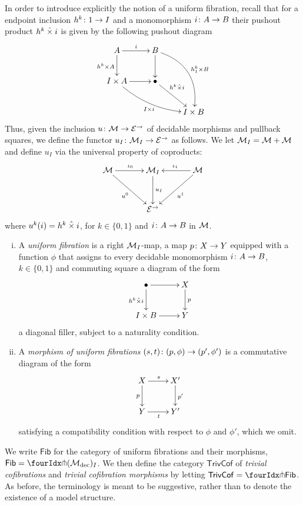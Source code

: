 \documentclass[reqno,10pt,a4paper,oneside]{amsart}
\begin{document}
In order to introduce explicitly the notion of a uniform  fibration, recall that for a endpoint inclusion $h^{k} \co 1 \to I$ and  a monomorphism $i \co A \to B$ their pushout product $h^k 
\hattimes i$ is given by the following pushout diagram
\[
\xymatrix{
 A \ar[r]^{i}  \ar[d]_{h^k \times A} &  B \ar@/^2em/[ddr]^{h^k_1 \times B} \ar[d] & \\ 
I \times A \ar@/_1em/[drr]_{I \times i} \ar[r] & \bullet \ar[dr]^-(.35){h^k \hattimes i}  & \\ 
 & & I \times B} 
 \]
 Thus, given the inclusion $u \co \cal{M} \to \cal{E}^\to$ of decidable morphisms and pullback squares, 
 we define the functor $u_{I} \co \cal{M}_{I} \to \cal{E}^\to$ as follows. 
We let $\cal{M}_{I} = \cal{M} + \cal{M}$ and define $u_{I}$ via the universal
 property of coproducts:
  \[
 \xymatrix@R=1.2cm@C=1.2cm{
 \cal{M} \ar[dr]_{u^0}  \ar[r]^{\iota_0} &  \cal{M}_{I} \ar[d]^{u_{I}} & \cal{M} \ar[dl]^{u^1} \ar[l]_{\iota_1} \\
  & \cal{E}^\to & }
  \]
  where $u^k(i) = h^k \hattimes i$,   for $k \in \{ 0, 1 \}$ and $i \co A \to B$ in $\cal{M}$. 


\begin{definition} \hfill 
\begin{enumerate}[(i)] 
\item  A \emph{uniform  fibration} is a right $\cal{M}_{I}$-map, \ie 
a map  $p \co X \to Y$ equipped with a function $\phi$ that assigns
to every decidable monomorphism $i \co A \to B$, $k \in \{0, 1\}$  and commuting
square a diagram of the form
\[
\xymatrix{
\bullet \ar[r] \ar[d]_{h^k \hattimes i} & X \ar[d]^p \\
I \times B \ar[r] & Y }
\]
a diagonal filler, subject to a naturality condition.
 \item A \emph{morphism of uniform fibrations} $(s,t) \co (p, \phi) \to (p', \phi')$ is
 a commutative diagram of the form
 \[
 \xymatrix{
  X \ar[d]_{p} \ar[r]^s & X' \ar[d]^{p'} \\
  Y \ar[r]_{t}& Y' } 
  \]
  satisfying a compatibility condition with respect to $\phi$ and $\phi'$, which we omit. 
 \end{enumerate}
 \end{definition}
 
 We write $\mathsf{Fib}$ for the category of uniform fibrations and their morphisms, \ie 
$\mathsf{Fib} = \liftr{(\cal{M}_{\textup{dec}})_I}$. We then define
the category $\mathsf{TrivCof}$ of \emph{trivial cofibrations} and \emph{trivial cofibration morphisms}
by letting \ie $\mathsf{TrivCof} = \liftl{\mathsf{Fib}}$. As before, the terminology is meant to be
suggestive, rather than to denote the existence of a model structure. 
 
\end{document}

